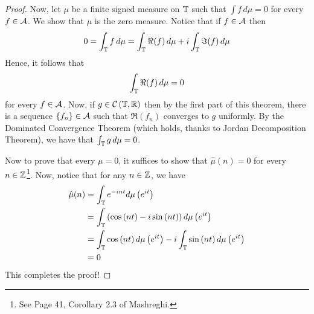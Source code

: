 \begin{proof}
Now, let $\mu$ be a finite signed measure on $\mathbb T$ such that $\int f \, d\mu =0$ for every $f \in {\cal A}$. We show that $\mu$ is the zero measure. Notice that if $f\in {\cal A}$ then
\begin{equation*}
    0=\int_{\mathbb T} f \, d\mu = \int_{\mathbb T} \Re (f) \, d\mu + i\int_{\mathbb T} \Im (f) \, d\mu
\end{equation*}
Hence, it follows that 
\begin{equation*}
    \int_{\mathbb T} \Re (f) \, d\mu = 0
\end{equation*}
for every $f\in {\cal A}$.
Now, if $g\in {\cal C} \left( \mathbb T, \mathbb R \right)$ then by the first part of this theorem, there is a sequence $\left\{ f_{n} \right\} \in {\cal A}$ such that $\Re \left( f_{n} \right) $ converges to $g$ uniformly. By the Dominated Convergence Theorem (which holds, thanks to Jordan Decomposition Theorem), we have that $\int_{\mathbb T} g \, d\mu = 0$. 

Now to prove that every $\mu = 0$, it suffices to show that $\hat{\mu} \left( n \right) = 0$ for every $n\in \mathbb Z$\footnote{See Page 41, Corollary 2.3 of Mashreghi.}. Now, notice that for any $n\in \mathbb Z$, we have
\begin{align*}
    \hat{\mu} (n) &= \int_{\mathbb T} e^{-int} d\mu \left( e^{it} \right) \\
    &=  \int_{\mathbb T} \left(\cos \left( nt \right) - i \sin \left( nt \right) \right) d\mu \left( e^{it} \right) \\
    &= \int_{\mathbb T} \cos \left( nt \right) d\mu \left( e^{it} \right) - i\int_{\mathbb T} \sin \left( nt \right) d\mu \left( e^{it} \right) \\
    &= 0
\end{align*}
This completes the proof!
\end{proof}

